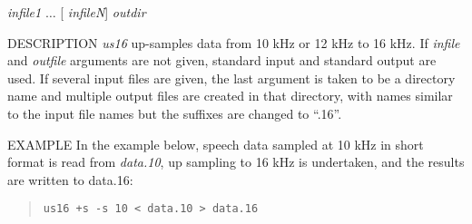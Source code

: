 \begin{synopsis}
\item [us16] [ --s $S$ ] [ +{\em type} ] [ {\em infile} ] [ {\em outfile} ]
\item [us16] [ --s $S$ ] [ +{\em type} ] {\em infile1} $\dots$ [ {\em infileN}] {\em outdir} 
\end{synopsis}

\begin{qsection}{DESCRIPTION}
{\em us16} up-samples data from 10 kHz or 12 kHz to 16 kHz. 
If {\em infile} and {\em outfile} arguments are not given, 
standard input and standard output are used. 
If several input files are given, 
the last argument is taken to be a directory name 
and multiple output files are created in that directory, 
with names similar to the input file names 
but the suffixes are changed to ``.16''.
\end{qsection}

\begin{options}
\end{options}

\begin{qsection}{EXAMPLE}
In the example below, speech data sampled at 10 kHz in short format
is read from {\em data.10}, up sampling to 16 kHz is undertaken,
and the results are written to {data.16}:
\begin{quote}
\verb!us16 +s -s 10 < data.10 > data.16!
\end{quote}
\end{qsection}


